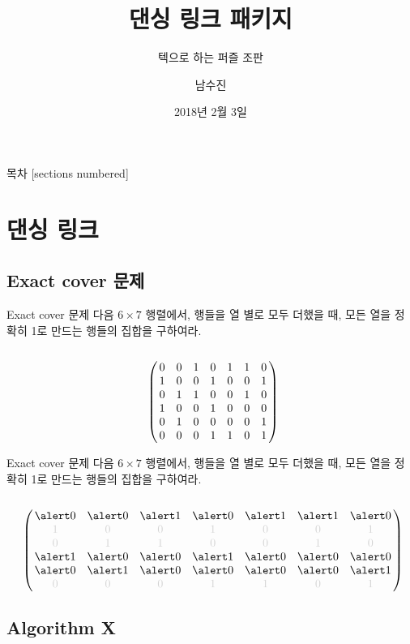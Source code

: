 \documentclass[xcolor=svgnames]{beamer}
\title{댄싱 링크 패키지}
\subtitle{텍으로 하는 퍼즐 조판}
\date{2018년 2월 3일}
\author{남수진}
\institute{2018 한국텍학회 학술대회 및 정기총회}
\let\a\alert
\def\g{\color{LightGray}}
\begin{document}
\maketitle

%
\begin{frame}{목차}
  [sections numbered]
  \tableofcontents
\end{frame}

%
\section{댄싱 링크}

%
\subsection{Exact cover 문제}

%
\begin{frame}{Exact cover 문제}
  다음 $6\times7$ 행렬에서, 행들을 열 별로 모두 더했을 때, 모든 열을
  정확히 1로 만드는 행들의 집합을 구하여라.
  {\Large\boldmath
    $$
    \bordermatrix{
      \mathstrut&&&&&&&\cr
      &0&0&1&0&1&1&0\cr
      &1&0&0&1&0&0&1\cr
      &0&1&1&0&0&1&0\cr
      &1&0&0&1&0&0&0\cr
      &0&1&0&0&0&0&1\cr
      &0&0&0&1&1&0&1}
    $$}
\end{frame}

%
\begin{frame}{Exact cover 문제}
  다음 $6\times7$ 행렬에서, 행들을 열 별로 모두 더했을 때, 모든 열을
  정확히 1로 만드는 행들의 집합을 구하여라.
  {\Large\boldmath
    $$
    \bordermatrix{
      \mathstrut&&&&&&&\cr  
      &\a0&\a0&\a1&\a0&\a1&\a1&\a0\cr
      &\g1&\g0&\g0&\g1&\g0&\g0&\g1\cr
      &\g0&\g1&\g1&\g0&\g0&\g1&\g0\cr
      &\a1&\a0&\a0&\a1&\a0&\a0&\a0\cr
      &\a0&\a1&\a0&\a0&\a0&\a0&\a1\cr
      &\g0&\g0&\g0&\g1&\g1&\g0&\g1}
    $$}
\end{frame}

%
\subsection{Algorithm X}
\end{document}

